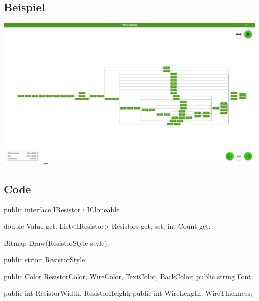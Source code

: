 \documentclass{article}
\begin{document}
\subsection{Beispiel}
\begin{center}
\includegraphics[scale=.3]{images/widerstand}
\label{FIG:widerstand}
\end{center}


\subsection{Code}
\begin{Csharp}[caption=Interface IResistor,label=LIS:IRes]
public interface IResistor : ICloneable
{
    double Value { get; }
    List<IResistor> Resistors { get; set; }
    int Count { get; }

    Bitmap Draw(ResistorStyle style);
}

public struct ResistorStyle
{
    public Color ResistorColor, WireColor, TextColor, BackColor;
    public string Font;

    public int ResistorWidth, ResistorHeight;
    public int WireLength, WireThickness;
}
\end{Csharp}
\end{document}

